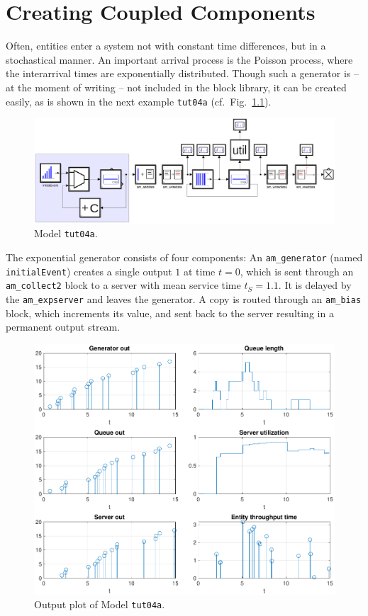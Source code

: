 \documentclass[12pt,oneside,a4paper,bibtotoc,BCOR=0pt,DIV=20]{scrreprt}
\newcommand{\cft}[1]{\mbox{\texttt{#1}}}   %
\begin{document}
\chapter{Creating Coupled Components} \label{sec6}

Often, entities enter a system not with constant time differences, but in a
stochastical manner. An important arrival process is the Poisson process, where
the interarrival times are exponentially distributed. Though such a generator
is -- at the moment of writing -- not included in the block library, it can be
created easily, as is shown in the next example \cft{tut04a}
(cf.\ Fig.\ \ref{fig_8}).

\begin{figure}[ht]
\centering
\includegraphics[width=0.99\columnwidth]{images/bild08.pdf}
\caption{Model \cft{tut04a}.}
\label{fig_8}
\end{figure}

The exponential generator consists of four components: An \cft{am\_generator}
(named \cft{initialEvent}) creates a single output $1$ at time $t = 0$, which
is sent through an \cft{am\_collect2} block to a server with mean service time
$t_S = 1.1$. It is delayed by the \cft{am\_expserver} and leaves the
generator. A copy is routed through an \cft{am\_bias} block, which increments
its value, and sent back to the server resulting in a permanent output stream.

\begin{figure}[ht]
\centering
\includegraphics[width=0.50\columnwidth]{images/bild09.pdf}
\caption{Output plot of Model \cft{tut04a}.}
\label{fig_9}
\end{figure}
\end{document}
